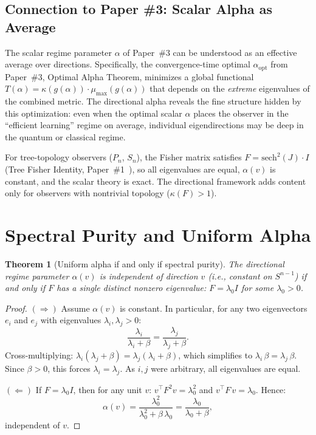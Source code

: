\documentclass[11pt,a4paper]{article}
\theoremstyle{plain}
\newtheorem{theorem}{Theorem}[section]
\theoremstyle{definition}
\newcommand{\Sn}{S^{n-1}}
\newcommand{\alphaopt}{\alpha_{\mathrm{opt}}}
\begin{document}
\subsection{Connection to Paper \#3: Scalar Alpha as Average}

The scalar regime parameter $\alpha$ of Paper~\#3 can be
understood as an effective average over directions.  Specifically,
the convergence-time optimal $\alphaopt$ from
Paper~\#3, Optimal Alpha Theorem, minimizes a global functional
$T(\alpha) = \kappa(g(\alpha)) \cdot \mu_{\max}(g(\alpha))$ that
depends on the \emph{extreme} eigenvalues of the combined metric.
The directional alpha reveals the fine structure hidden by this
optimization: even when the optimal scalar $\alpha$ places the
observer in the ``efficient learning'' regime on average, individual
eigendirections may be deep in the quantum or classical regime.

For tree-topology observers ($P_n$, $S_n$), the Fisher matrix
satisfies $F = \text{sech}^2(J) \cdot I$ (Tree Fisher Identity,
Paper~\#1~\cite{companion_lovelock}), so all eigenvalues are
equal, $\alpha(v)$ is constant, and the scalar theory is exact.
The directional framework adds content only for observers with
nontrivial topology ($\kappa(F) > 1$).



\section{Spectral Purity and Uniform Alpha}
\label{sec:spectral}

\begin{theorem}[Uniform alpha if and only if spectral purity]
\label{thm:uniform_alpha}
The directional regime parameter $\alpha(v)$ is independent of
direction $v$ (i.e., constant on $\Sn$) if and only if $F$ has a
single distinct nonzero eigenvalue: $F = \lambda_0 I$ for some
$\lambda_0 > 0$.
\end{theorem}

\begin{proof}
$(\Longrightarrow)$ Assume $\alpha(v)$ is constant.  In
particular, for any two eigenvectors $e_i$ and $e_j$
with eigenvalues $\lambda_i, \lambda_j > 0$:
\[
\frac{\lambda_i}{\lambda_i + \beta}
  = \frac{\lambda_j}{\lambda_j + \beta}.
\]
Cross-multiplying:
$\lambda_i(\lambda_j + \beta) = \lambda_j(\lambda_i + \beta)$,
which simplifies to $\lambda_i\,\beta = \lambda_j\,\beta$.
Since $\beta > 0$, this forces $\lambda_i = \lambda_j$.
As $i, j$ were arbitrary, all eigenvalues are equal.

$(\Longleftarrow)$ If $F = \lambda_0 I$, then for any unit $v$:
$v^\top F^2 v = \lambda_0^2$ and $v^\top F\, v = \lambda_0$.
Hence:
\[
\alpha(v) = \frac{\lambda_0^2}{\lambda_0^2 + \beta\,\lambda_0}
          = \frac{\lambda_0}{\lambda_0 + \beta},
\]
independent of $v$.
\end{proof}
\end{document}
